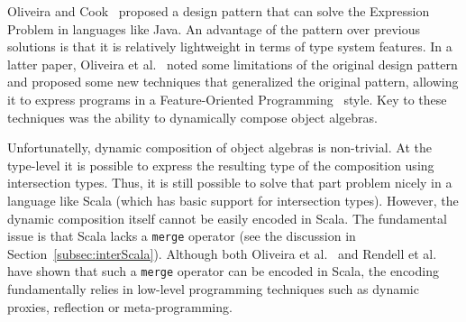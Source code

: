 



Oliveira and Cook~\cite{oliveira2012extensibility} proposed a design pattern that can solve the
Expression Problem in languages like Java. An advantage of the pattern
over previous solutions is that it is relatively lightweight in terms
of type system features. In a latter paper, Oliveira et al.~\cite{oliveira2013feature}
noted some limitations of the original design pattern and proposed
some new techniques that generalized the original pattern, allowing it
to express programs in a Feature-Oriented Programming~\cite{Prehofer97} style.
Key to these techniques was the ability to dynamically compose object
algebras.

Unfortunatelly, dynamic composition of object algebras is
non-trivial. At the type-level it is possible to express the resulting
type of the composition using intersection types. Thus, it is still
possible to solve that part problem nicely in a language like Scala (which
has basic support for intersection types). However, the dynamic
composition itself cannot be easily encoded in Scala. The fundamental
issue is that Scala lacks a \lstinline{merge} operator (see the
discussion in Section~\ref{subsec:interScala}). Although both Oliveira et al.~\cite{oliveira2013feature} and
Rendell et al.~\cite{rendel14attributes} have shown that such a \lstinline{merge} operator can
be encoded in Scala, the encoding fundamentally relies in low-level
programming techniques such as dynamic proxies, reflection or
meta-programming.

